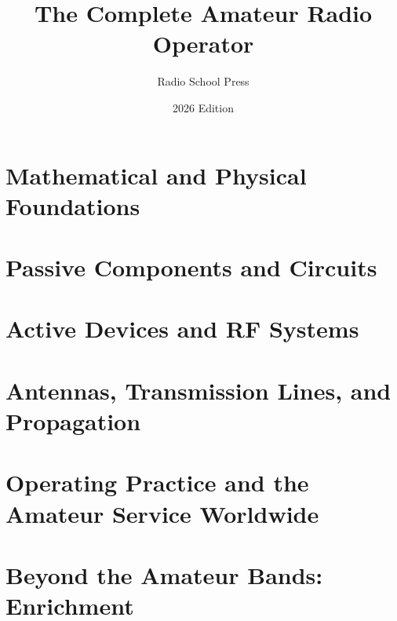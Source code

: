 \documentclass[11pt,oneside]{book}
\title{The Complete Amateur Radio Operator}
\author{Radio School Press}
\date{2026 Edition}
\begin{document}


\frontmatter


\tableofcontents

\mainmatter

\part{Mathematical and Physical Foundations}







\part{Passive Components and Circuits}







\part{Active Devices and RF Systems}







\part{Antennas, Transmission Lines, and Propagation}




\part{Operating Practice and the Amateur Service Worldwide}







\part{Beyond the Amateur Bands: Enrichment}


\appendix



\end{document}
